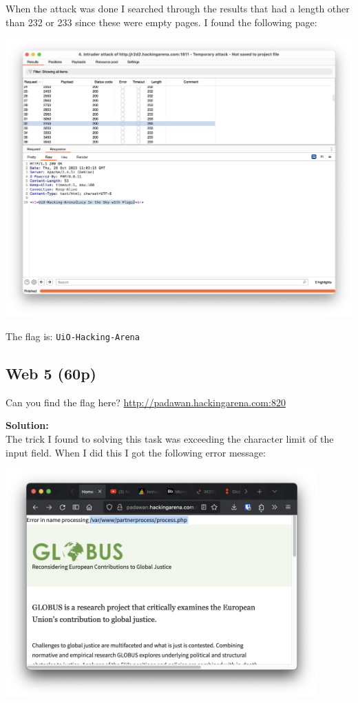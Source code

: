 When the attack was done I searched through the results that had a length other than 232 or 233 since these were empty pages. I found the following page:

\begin{center}
    \includegraphics[width=15cm]{img/Web hacking/Beatles song catalogue/Skjermbilde 2023-10-26 kl. 13.06.58.png}
\end{center}

The flag is: \texttt{UiO-Hacking-Arena}

\newpage
\subsection{Web 5 (60p)}
Can you find the flag here?
\url{http://padawan.hackingarena.com:820}

\textbf{Solution:}\\
The trick I found to solving this task was exceeding the character limit of the input field. When I did this I got the following error message:

\begin{center}
    \includegraphics[width=12cm]{img/Web hacking/Web 5/Skjermbilde 2023-10-26 kl. 13.37.52.png}
\end{center}

